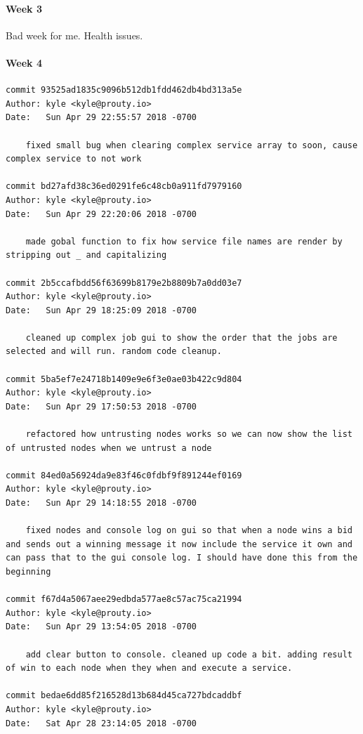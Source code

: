 \documentclass[draftclsnofoot, onecolumn, compsoc, 10pt]{IEEEtran}
\begin{document}
\paragraph{Week 3}
Bad week for me. Health issues.
\paragraph{Week 4}
\begin{lstlisting}
commit 93525ad1835c9096b512db1fdd462db4bd313a5e 
Author: kyle <kyle@prouty.io> 
Date:   Sun Apr 29 22:55:57 2018 -0700 

    fixed small bug when clearing complex service array to soon, cause complex service to not work 

commit bd27afd38c36ed0291fe6c48cb0a911fd7979160 
Author: kyle <kyle@prouty.io> 
Date:   Sun Apr 29 22:20:06 2018 -0700 

    made gobal function to fix how service file names are render by stripping out _ and capitalizing 

commit 2b5ccafbdd56f63699b8179e2b8809b7a0dd03e7 
Author: kyle <kyle@prouty.io> 
Date:   Sun Apr 29 18:25:09 2018 -0700 

    cleaned up complex job gui to show the order that the jobs are selected and will run. random code cleanup. 

commit 5ba5ef7e24718b1409e9e6f3e0ae03b422c9d804 
Author: kyle <kyle@prouty.io> 
Date:   Sun Apr 29 17:50:53 2018 -0700 

    refactored how untrusting nodes works so we can now show the list of untrusted nodes when we untrust a node 

commit 84ed0a56924da9e83f46c0fdbf9f891244ef0169 
Author: kyle <kyle@prouty.io> 
Date:   Sun Apr 29 14:18:55 2018 -0700 

    fixed nodes and console log on gui so that when a node wins a bid and sends out a winning message it now include the service it own and can pass that to the gui console log. I should have done this from the beginning 

commit f67d4a5067aee29edbda577ae8c57ac75ca21994 
Author: kyle <kyle@prouty.io> 
Date:   Sun Apr 29 13:54:05 2018 -0700 

    add clear button to console. cleaned up code a bit. adding result of win to each node when they when and execute a service. 

commit bedae6dd85f216528d13b684d45ca727bdcaddbf 
Author: kyle <kyle@prouty.io> 
Date:   Sat Apr 28 23:14:05 2018 -0700 


\end{lstlisting}
\end{document}
